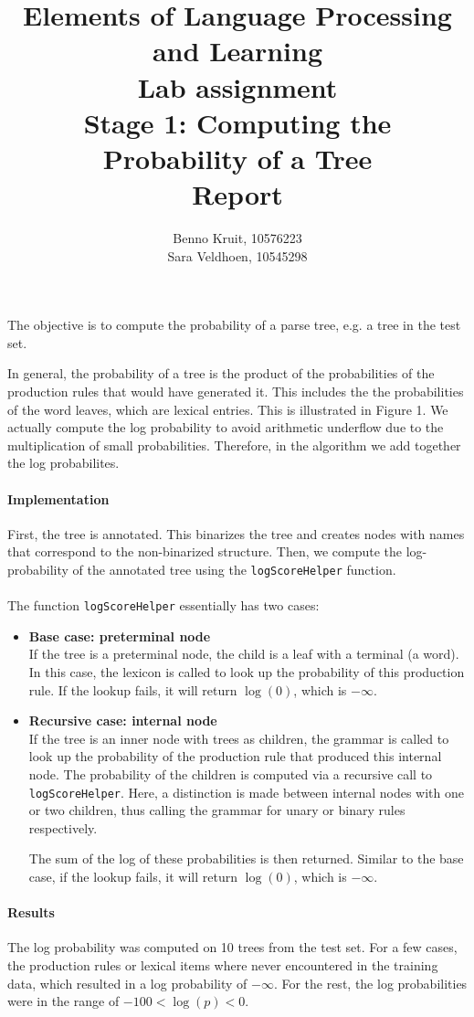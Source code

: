 \documentclass{article}
\title{Elements of Language Processing and Learning\\
Lab assignment \\
Stage 1: Computing the Probability of a Tree\\
Report}
\author{Benno Kruit, 10576223\\Sara Veldhoen, 10545298}
\begin{document}
\maketitle

The objective is to compute the probability of a parse tree, e.g. a tree in the test set. 


In general, the probability of a tree is the product of the probabilities of the production rules that would have generated it.
This includes the the probabilities of the word leaves, which are lexical entries. This is illustrated in Figure 1.
We actually compute the log probability to avoid arithmetic underflow due to the multiplication of small probabilities. Therefore, in the algorithm we add together the log probabilites.

\begin{figure}

\end{figure}

\paragraph{Implementation}
First, the tree is annotated. This binarizes the tree and creates nodes with names that correspond to the non-binarized structure. Then, we compute the log-probability of the annotated tree using the \texttt{logScoreHelper} function.

\paragraph{}
The function \texttt{logScoreHelper} essentially has two cases:
\begin{itemize}
	\item \textbf{Base case: preterminal node}\\
	 If the tree is a preterminal node, the child is a leaf with a terminal (a word). In this case, the lexicon is called to look up the probability of this production rule. If the lookup fails, it will return $\log(0)$, which is $-\infty$.
	\item \textbf{Recursive case: internal node}\\
	 If the tree is an inner node with trees as children, the grammar is called to look up  the probability of the production rule that produced this internal node. The probability of the children is computed via a recursive call to \texttt{logScoreHelper}. Here, a distinction is made between internal nodes with one or two children, thus calling the grammar for unary or binary rules respectively.

 The sum of the log of these probabilities is then returned. Similar to the base case, if the lookup fails,  it will return $\log(0)$, which is $-\infty$.
\end{itemize}

\paragraph{Results}
The log probability was computed on 10 trees from the test set.
For a few cases, the production rules or lexical items where never encountered in the training data, which resulted in a log probability of $-\infty$. For the rest, the log probabilities were in the range of $-100 < \log(p) < 0$.
\end{document}
